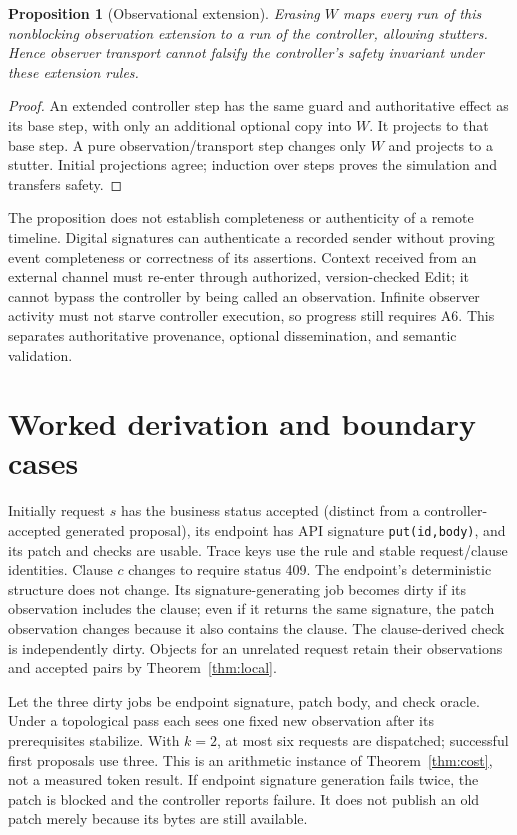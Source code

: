 \documentclass[pdflatex,sn-mathphys-num]{sn-jnl}
\theoremstyle{thmstyleone}
\newtheorem{proposition}[theorem]{Proposition}
\theoremstyle{thmstylethree}
\theoremstyle{thmstyletwo}
\begin{document}
\begin{proposition}[Observational extension]\label{prop:observation}
Erasing $W$ maps every run of this nonblocking observation extension to a run of the controller, allowing stutters. Hence observer transport cannot falsify the controller's safety invariant under these extension rules.
\end{proposition}
\begin{proof}
An extended controller step has the same guard and authoritative effect as its base step, with only an additional optional copy into $W$. It projects to that base step. A pure observation/transport step changes only $W$ and projects to a stutter. Initial projections agree; induction over steps proves the simulation and transfers safety.\qedhere
\end{proof}

The proposition does not establish completeness or authenticity of a remote timeline. Digital signatures can authenticate a recorded sender without proving event completeness or correctness of its assertions. Context received from an external channel must re-enter through authorized, version-checked Edit; it cannot bypass the controller by being called an observation. Infinite observer activity must not starve controller execution, so progress still requires A6. This separates authoritative provenance, optional dissemination, and semantic validation.

\section{Worked derivation and boundary cases}\label{sec:example}
Initially request $s$ has the business status accepted (distinct from a controller-accepted generated proposal), its endpoint has API signature \texttt{put(id,body)}, and its patch and checks are usable. Trace keys use the rule and stable request/clause identities. Clause $c$ changes to require status 409. The endpoint's deterministic structure does not change. Its signature-generating job becomes dirty if its observation includes the clause; even if it returns the same signature, the patch observation changes because it also contains the clause. The clause-derived check is independently dirty. Objects for an unrelated request retain their observations and accepted pairs by Theorem~\ref{thm:local}.

Let the three dirty jobs be endpoint signature, patch body, and check oracle. Under a topological pass each sees one fixed new observation after its prerequisites stabilize. With $k=2$, at most six requests are dispatched; successful first proposals use three. This is an arithmetic instance of Theorem~\ref{thm:cost}, not a measured token result. If endpoint signature generation fails twice, the patch is blocked and the controller reports failure. It does not publish an old patch merely because its bytes are still available.
\end{document}
